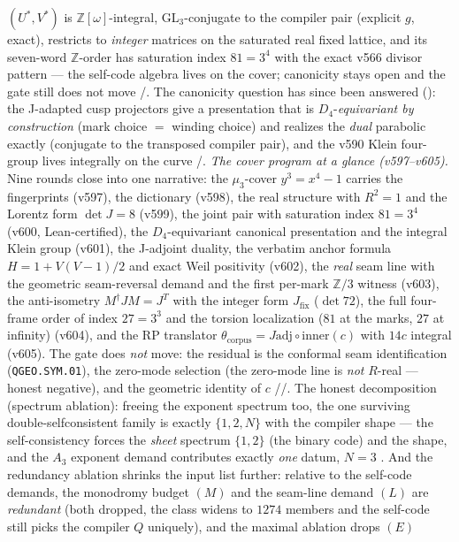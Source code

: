 \documentclass[11pt,a4paper]{article}
\theoremstyle{definition}
\begin{document}
\begin{keybox}
$(U^*,V^*)$ is $\mathbb{Z}[\omega]$-integral, GL$_3$-conjugate to the
compiler pair (explicit $g$, exact), restricts to \emph{integer}
matrices on the saturated real fixed lattice, and its seven-word
$\mathbb{Z}$-order has saturation index $81=3^4$ with the exact v566
divisor pattern --- the self-code algebra lives on the cover;
canonicity stays open and the gate still does not move \mE/\mC.  The
canonicity question has since been answered
(): the J-adapted cusp projectors
give a presentation that is $D_4$-\emph{equivariant by construction}
(mark choice $=$ winding choice) and realizes the \emph{dual}
parabolic exactly (conjugate to the transposed compiler pair), and
the v590 Klein four-group lives integrally on the curve \mE/\mC.
\emph{The cover program at a glance (v597--v605).}  Nine rounds close
into one narrative: the $\mu_3$-cover $y^3=x^4-1$ carries the
fingerprints (v597), the dictionary (v598), the real structure with
$R^2{=}1$ and the Lorentz form $\det J=8$ (v599), the joint pair with
saturation index $81=3^4$ (v600, Lean-certified), the
$D_4$-equivariant canonical presentation and the integral Klein group
(v601), the J-adjoint duality, the verbatim anchor formula
$H=1+V(V-1)/2$ and exact Weil positivity (v602), the \emph{real} seam
line with the geometric seam-reversal demand and the first per-mark
$\mathbb{Z}/3$ witness (v603), the anti-isometry
$M^\dagger JM=J^T$ with the integer form $J_{\mathrm{fix}}$
($\det 72$), the full four-frame order of index $27=3^3$ and the
torsion localization ($81$ at the marks, $27$ at infinity) (v604),
and the RP translator
$\theta_{\mathrm{corpus}}=J\mathrm{adj}\circ\mathrm{inner}(c)$ with
$14c$ integral (v605).  The gate does \emph{not} move: the residual
is the conformal seam identification (\texttt{QGEO.SYM.01}), the
zero-mode selection (the zero-mode line is \emph{not} $R$-real ---
honest negative), and the geometric identity of $c$ \mE/\mC/\mO.
The honest decomposition (spectrum ablation): freeing
the exponent spectrum too, the one surviving double-selfconsistent
family is exactly $\{1,2,N\}$ with the compiler shape --- the
self-consistency forces the \emph{sheet} spectrum $\{1,2\}$ (the binary
code) and the shape, and the $A_3$ exponent demand contributes exactly
\emph{one} datum, $N=3$ \mE.  And the redundancy ablation shrinks the
input list further: relative to the self-code demands, the monodromy
budget $(M)$ and the seam-line demand $(L)$ are \emph{redundant} (both
dropped, the class widens to $1274$ members and the self-code still
picks the compiler $Q$ uniquely), and the maximal ablation drops $(E)$

\end{keybox}
\end{document}
